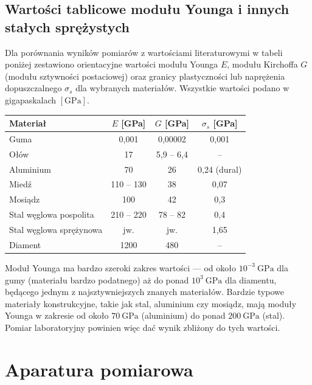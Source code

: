 \documentclass{fizykalab}
\begin{document}
\subsection{Wartości tablicowe modułu Younga i innych stałych sprężystych}

Dla porównania wyników pomiarów z wartościami literaturowymi w tabeli
poniżej zestawiono orientacyjne wartości modułu Younga \(E\), modułu
Kirchoffa \(G\) (modułu sztywności postaciowej) oraz granicy plastyczności
lub naprężenia dopuszczalnego \(\sigma_s\) dla wybranych materiałów.
Wszystkie wartości podano w gigapaskalach \([\mathrm{GPa}]\).

\bigskip
\begin{center}
  \begin{tabular}{|l|c|c|c|}
    \hline
    \textbf{Materiał} & \textbf{\(E\) [GPa]} & \textbf{\(G\) [GPa]} & \textbf{\(\sigma_s\) [GPa]} \\
    \hline
    Guma & 0{,}001 & 0{,}00002 & 0{,}001 \\
    \hline
    Ołów & 17 & 5{,}9 -- 6{,}4 & -- \\
    \hline
    Aluminium & 70 & 26 & 0{,}24 (dural) \\
    \hline
    Miedź & 110 -- 130 & 38 & 0{,}07 \\
    \hline
    Mosiądz & 100 & 42 & 0{,}3 \\
    \hline
    Stal węglowa pospolita & 210 -- 220 & 78 -- 82 & 0{,}4 \\
    \hline
    Stal węglowa sprężynowa & jw. & jw. & 1{,}65 \\
    \hline
    Diament & 1200 & 480 & -- \\
    \hline
  \end{tabular}
\end{center}

\bigskip
Moduł Younga ma bardzo szeroki zakres wartości — od około
\(10^{-3}\ \mathrm{GPa}\) dla gumy (materiału bardzo podatnego) aż do
ponad \(10^{3}\ \mathrm{GPa}\) dla diamentu, będącego jednym z
najsztywniejszych znanych materiałów. Bardzie typowe materiały konstrukcyjne,
takie jak stal, aluminium czy mosiądz, mają moduły Younga w
zakresie od około \(70\ \mathrm{GPa}\) (aluminium) do ponad
\(200\ \mathrm{GPa}\) (stal). Pomiar laboratoryjny powinien więc dać wynik
zbliżony do tych wartości.

\pagebreak
\section{Aparatura pomiarowa}
\end{document}
